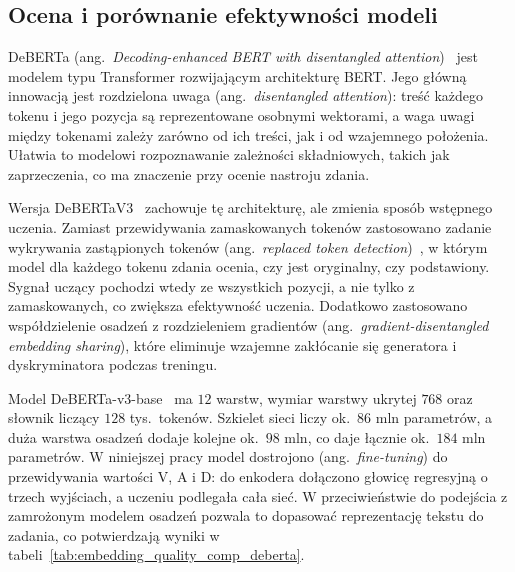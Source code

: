\FloatBarrier
\subsection{Ocena i porównanie efektywności modeli}
\label{sec:deberta_theory}
DeBERTa (ang.\ \textit{Decoding-enhanced BERT with disentangled
attention})~\cite{he2021deberta} jest modelem typu Transformer rozwijającym
architekturę BERT. Jego główną innowacją jest rozdzielona uwaga (ang.\
\textit{disentangled attention}): treść każdego tokenu i jego pozycja są
reprezentowane osobnymi wektorami, a waga uwagi między tokenami zależy zarówno od
ich treści, jak i od wzajemnego położenia. Ułatwia to modelowi rozpoznawanie
zależności składniowych, takich jak zaprzeczenia, co ma znaczenie przy ocenie
nastroju zdania.

Wersja DeBERTaV3~\cite{he2023debertav3improvingdebertausing} zachowuje tę
architekturę, ale zmienia sposób wstępnego uczenia. Zamiast przewidywania
zamaskowanych tokenów zastosowano zadanie wykrywania zastąpionych tokenów (ang.\
\textit{replaced token detection})~\cite{clark2020electra}, w którym model dla
każdego tokenu zdania ocenia, czy jest oryginalny, czy podstawiony. Sygnał uczący
pochodzi wtedy ze wszystkich pozycji, a nie tylko z zamaskowanych, co zwiększa
efektywność uczenia. Dodatkowo zastosowano współdzielenie osadzeń z rozdzieleniem
gradientów (ang.\ \textit{gradient-disentangled embedding sharing}), które
eliminuje wzajemne zakłócanie się generatora i dyskryminatora podczas treningu.

Model DeBERTa-v3-base~\cite{deberta_v3_base} ma $12$ warstw, wymiar warstwy
ukrytej $768$ oraz słownik liczący $128$ tys.\ tokenów. Szkielet sieci liczy ok.\
$86$ mln parametrów, a duża warstwa osadzeń dodaje kolejne ok.\ $98$ mln, co daje
łącznie ok.\ $184$ mln parametrów. W niniejszej pracy model dostrojono
(ang.\ \textit{fine-tuning}) do przewidywania wartości V, A i D: do enkodera
dołączono głowicę regresyjną o trzech wyjściach, a uczeniu podlegała cała sieć.
W przeciwieństwie do podejścia z zamrożonym modelem osadzeń pozwala to dopasować
reprezentację tekstu do zadania, co potwierdzają wyniki w
tabeli~\ref{tab:embedding_quality_comp_deberta}.

